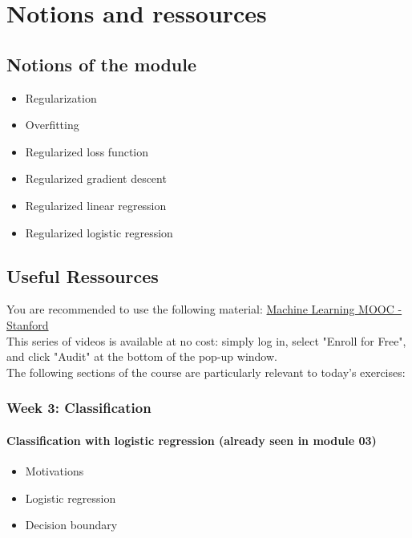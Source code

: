 

\chapter*{Notions and ressources}

\section*{Notions of the module}
\begin{itemize}
  \item Regularization
  \item Overfitting
  \item Regularized loss function
  \item Regularized gradient descent
  \item Regularized linear regression
  \item Regularized logistic regression
\end{itemize}

\section*{Useful Ressources}

You are recommended to use the following material: \href{https://www.coursera.org/learn/machine-learning}{Machine Learning MOOC - Stanford}\\
\newline
This series of videos is available at no cost: simply log in, select "Enroll for Free", and click "Audit" at the bottom of the pop-up window.\\
\newline
The following sections of the course are particularly relevant to today's exercises: 

\subsection*{Week 3: Classification}

\subsubsection*{Classification with logistic regression (already seen in module 03)}
\begin{itemize}
  \item Motivations
  \item Logistic regression
  \item Decision boundary
\end{itemize}

